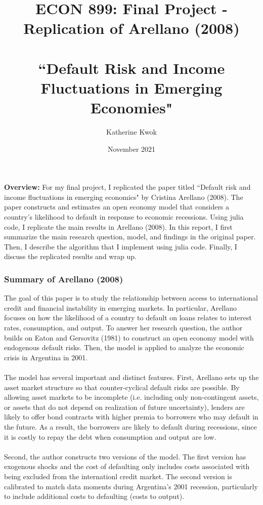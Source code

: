 \documentclass[12pt]{article}
\title{ECON 899: Final Project - Replication of Arellano (2008)\\\\{\large ``Default Risk and Income Fluctuations in Emerging Economies"}}
\author{Katherine Kwok}
\date{November 2021}
\begin{document}
\maketitle
\noindent \textbf{Overview:} For my final project, I replicated the paper titled ``Default risk and income fluctuations in emerging economics" by Cristina Arellano (2008). The paper constructs and estimates an open economy model that considers a country's likelihood to default in response to economic recessions. Using julia code, I replicate the main results in Arellano (2008). In this report, I first summarize the main research question, model, and findings in the original paper. Then, I describe the algorithm that I implement using julia code. Finally, I discuss the replicated results and wrap up.


\subsubsection*{Summary of Arellano (2008)}

The goal of this paper is to study the relationship between access to international credit and financial instability in emerging markets. In particular, Arellano focuses on how the likelihood of a country to default on loans relates to interest rates, consumption, and output. To answer her research question, the author builds on Eaton and Gersovitz (1981) to construct an open economy model with endogenous default risks. Then, the model is applied to analyze the economic crisis in Argentina in 2001. \\\\
The model has several important and distinct features. First, Arellano sets up the asset market structure so that counter-cyclical default risks are possible. By allowing asset markets to be incomplete (i.e. including only non-contingent assets, or assets that do not depend on realization of future uncertainty), lenders are likely to offer bond contracts with higher premia to borrowers who may default in the future. As a result, the borrowers are likely to default during recessions, since it is costly to repay the debt when consumption and output are low.\\\\
Second, the author constructs two versions of the model. The first version has exogenous shocks and the cost of defaulting only includes costs associated with being excluded from the internationl credit market. The second version is calibrated to match data moments during Argentina's 2001 recession, particularly to include additional costs to defaulting (costs to output).
\end{document}
